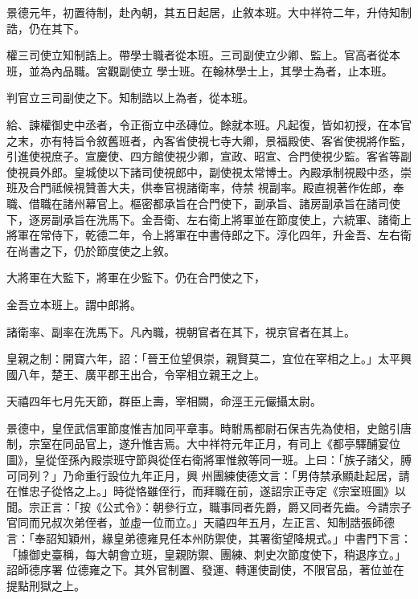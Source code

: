 \begin{pinyinscope}
 景德元年，初置待制，赴內朝，其五日起居，止敘本班。大中祥符二年，升侍知制誥，仍在其下。



 權三司使立知制誥上。帶學士職者從本班。三司副使立少卿、監上。官高者從本班，並為內品職。宮觀副使立
 學士班。在翰林學士上，其學士為者，止本班。



 判官立三司副使之下。知制誥以上為者，從本班。



 給、諫權御史中丞者，令正衙立中丞磚位。餘就本班。凡起復，皆如初授，在本官之末，亦有特旨令敘舊班者，內客省使視七寺大卿，景福殿使、客省使視將作監，引進使視庶子。宣慶使、四方館使視少卿，宣政、昭宣、合門使視少監。客省等副使視員外郎。皇城使以下諸司使視郎中，副使視太常博士。內殿承制視殿中丞，崇班及合門祗候視贊善大夫，供奉官視諸衛率，侍禁
 視副率。殿直視著作佐郎，奉職、借職在諸州幕官上。樞密都承旨在合門使下，副承旨、諸房副承旨在諸司使下，逐房副承旨在洗馬下。金吾衛、左右衛上將軍並在節度使上，六統軍、諸衛上將軍在常侍下，乾德二年，令上將軍在中書侍郎之下。淳化四年，升金吾、左右衛在尚書之下，仍於節度使之上敘。



 大將軍在大監下，將軍在少監下。仍在合門使之下，



 金吾立本班上。謂中郎將。



 諸衛率、副率在洗馬下。凡內職，視朝官者在其下，視京官者在其上。



 皇親之制：開寶六年，詔：「晉王位望俱崇，親賢莫二，宜位在宰相之上。」太平興國八年，楚王、廣平郡王出合，令宰相立親王之上。



 天禧四年七月先天節，群臣上壽，宰相闕，命涇王元儼攝太尉。



 景德中，皇侄武信軍節度惟吉加同平章事。時駙馬都尉石保吉先為使相，史館引唐制，宗室在同品官上，遂升惟吉焉。大中祥符元年正月，有司上《都亭驛酺宴位圖》，皇從侄孫內殿崇班守節與從侄右衛將軍惟敘等同一班。上曰：「族子諸父，膊可同列？」乃命重行設位九年正月，興
 州團練使德文言：「男侍禁承顯赴起居，請在惟忠子從恪之上。」時從恪雖侄行，而拜職在前，遂詔宗正寺定《宗室班圖》以聞。宗正言：「按《公式令》：朝參行立，職事同者先爵，爵又同者先齒。今請宗子官同而兄叔次弟侄者，並虛一位而立。」天禧四年五月，左正言、知制誥張師德言：「奉詔知穎州，緣皇弟德雍見任本州防禦使，其署銜望降規式。」中書門下言：「據御史臺稱，每大朝會立班，皇親防禦、團練、刺史次節度使下，稍退序立。」詔師德序署
 位德雍之下。其外官制置、發運、轉運使副使，不限官品，著位並在提點刑獄之上。




\end{pinyinscope}
